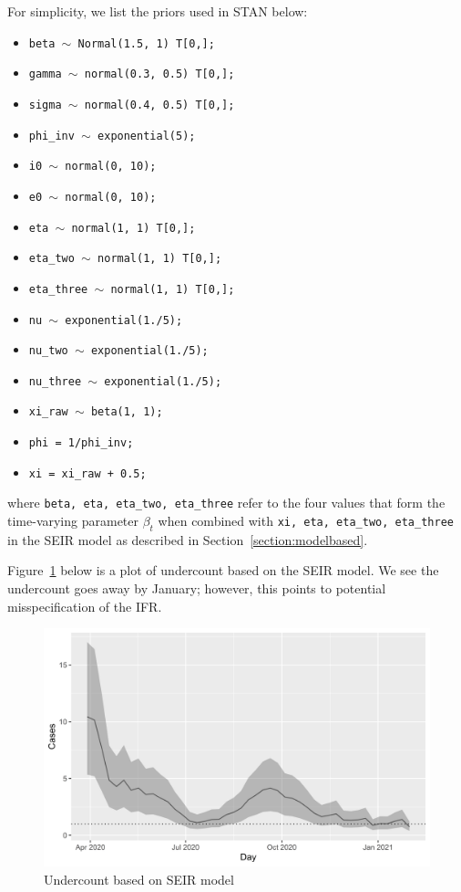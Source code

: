 \documentclass[11pt]{amsart}
\numberwithin{equation}{section}
\theoremstyle{plain}
\def\code#1{\texttt{#1}}
\begin{document}
For simplicity, we list the priors used in STAN below:
\begin{itemize}
  \item \code{beta $\sim$ Normal(1.5, 1) T[0,];}
  \item \code{gamma $\sim$ normal(0.3, 0.5) T[0,];}
  \item \code{sigma $\sim$ normal(0.4, 0.5) T[0,];}
  \item \code{phi\_inv $\sim$ exponential(5);}
  \item \code{i0 $\sim$ normal(0, 10);}
  \item \code{e0 $\sim$ normal(0, 10);}
  \item \code{eta $\sim$ normal(1, 1) T[0,];}
  \item \code{eta\_two $\sim$ normal(1, 1) T[0,];}
  \item \code{eta\_three $\sim$ normal(1, 1) T[0,];}
  \item \code{nu $\sim$ exponential(1./5);}
  \item \code{nu\_two $\sim$ exponential(1./5);}
  \item \code{nu\_three $\sim$ exponential(1./5);}
  \item \code{xi\_raw $\sim$ beta(1, 1);}
  \item \code{phi = 1/phi\_inv;}
  \item \code{xi = xi\_raw + 0.5;}
\end{itemize}
where \code{beta, eta, eta\_two, eta\_three} refer to the four values that form the time-varying parameter $\beta_t$ when combined with \code{xi, eta, eta\_two, eta\_three} in the SEIR model as described in Section~\ref{section:modelbased}.

Figure~\ref{fig:undercounting} below is a plot of undercount based on the SEIR model.  We see the undercount goes away by January; however, this points to potential misspecification of the IFR.

\begin{figure}[!th]
 \centering
 \includegraphics[width=.7\linewidth]{../figs/undercounting.png}
 \caption{Undercount based on SEIR model}
 \label{fig:undercounting}
\end{figure}



\end{document}

